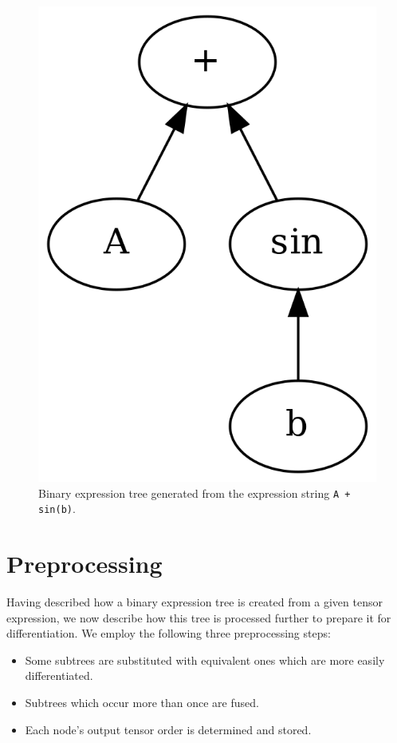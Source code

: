 \documentclass[12pt, a4paper]{report}
\begin{document}
\begin{figure}
    \centering
    \includegraphics[scale=0.25]{tree_example.png}
    \caption{Binary expression tree generated from the expression string \texttt{A + sin(b)}.}
    \label{fig:tree_example}
\end{figure}

\section{Preprocessing}
Having described how a binary expression tree is created from a given tensor expression, we now describe how this tree is processed further to prepare it for differentiation.
We employ the following three preprocessing steps:
\begin{itemize}
    \item Some subtrees are substituted with equivalent ones which are more easily differentiated.
    \item Subtrees which occur more than once are fused.
    \item Each node's output tensor order is determined and stored.
\end{itemize}
\end{document}
